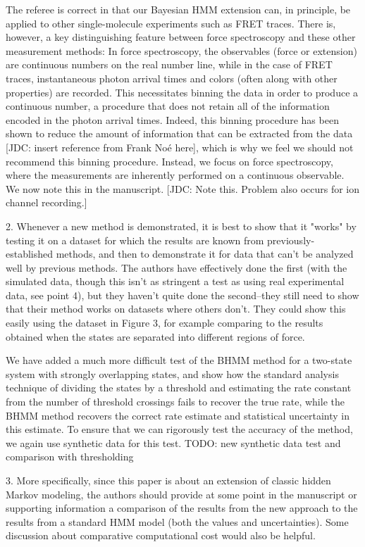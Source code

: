 \documentclass[ucb,qb3,10pt,fullfrom]{ucletter}
\begin{document}
\begin{letter}{}
The referee is correct in that our Bayesian HMM extension can, in principle, be applied to other single-molecule experiments such as FRET traces.
There is, however, a key distinguishing feature between force spectroscopy and these other measurement methods: In force spectroscopy, the observables (force or extension) are continuous numbers on the real number line, while in the case of FRET traces, instantaneous photon arrival times and colors (often along with other properties) are recorded.
This necessitates binning the data in order to produce a continuous number, a procedure that does not retain all of the information encoded in the photon arrival times.
Indeed, this binning procedure has been shown to reduce the amount of information that can be extracted from the data {\color{blue}[JDC: insert reference from Frank No\'{e} here]}, which is why we feel we should not recommend this binning procedure.
Instead, we focus on force spectroscopy, where the measurements are inherently performed on a continuous observable.
We now note this in the manuscript.
{\color{blue}[JDC: Note this. Problem also occurs for ion channel recording.] }

\color{red}
2. Whenever a new method is demonstrated, it is best to show that it "works" by testing it on a dataset for which the results are known from previously-established methods, and then to demonstrate it for data that can't be analyzed well by previous methods. The authors have effectively done the first (with the simulated data, though this isn't as stringent a test as using real experimental data, see point 4), but they haven't quite done the second--they still need to show that their method works on datasets where others don't. They could show this easily using the dataset in Figure 3, for example comparing to the results obtained when the states are separated into different regions of force. 
\color{black}

We have added a much more difficult test of the BHMM method for a two-state system with strongly overlapping states, and show how the standard analysis technique of dividing the states by a threshold and estimating the rate constant from the number of threshold crossings fails to recover the true rate, while the BHMM method recovers the correct rate estimate and statistical uncertainty in this estimate.
To ensure that we can rigorously test the accuracy of the method, we again use synthetic data for this test. {\color{blue} TODO: new synthetic data test and comparison with thresholding}

\color{red}
3. More specifically, since this paper is about an extension of classic hidden Markov modeling, the authors should provide at some point in the manuscript or supporting information a comparison of the results from the new approach to the results from a standard HMM model (both the values and uncertainties). Some discussion about comparative computational cost would also be helpful.
\color{black}


\end{letter}
\end{document}
